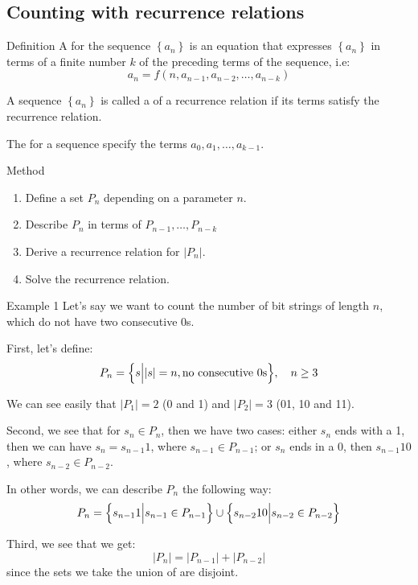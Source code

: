 \documentclass[a4paper]{article}
\begin{document}
\subsection{Counting with recurrence relations}
\begin{parag}{Definition}
    A  for the sequence $\left\{a_n\right\}$ is an equation that expresses $\left\{a_n\right\}$ in terms of a finite number $k$ of the preceding terms of the sequence, i.e: 
    \[a_n = f\left(n, a_{n-1}, a_{n-2}, \ldots, a_{n-k}\right)\]
    
    A sequence $\left\{a_n\right\}$ is called a  of a recurrence relation if its terms satisfy the recurrence relation.

    The  for a sequence specify the terms $a_0, a_1, \ldots, a_{k-1}$.
\end{parag}

\begin{parag}{Method}
    \begin{enumerate}[left=0pt]
        \item Define a set $P_n$ depending on a parameter $n$.
        \item Describe $P_n$ in terms of $P_{n-1}, \ldots, P_{n-k}$
        \item Derive a recurrence relation for $\left|P_n\right|$.
        \item Solve the recurrence relation.
    \end{enumerate}
\end{parag}

\begin{parag}{Example 1}
    Let's say we want to count the number of bit strings of length $n$, which do not have two consecutive 0s. 

    First, let's define:
    \[P_n = \left\{s \eval \left|s\right| = n, \text{no consecutive 0s}\right\}, \mathspace n \geq 3\]

    We can see easily that $\left|P_1\right| = 2$ (0 and 1) and $\left|P_2\right| = 3$ (01, 10 and 11). 

    Second, we see that for $s_n \in P_n$, then we have two cases: either $s_n$ ends with a 1, then we can have $s_n = s_{n-1} 1$, where $s_{n-1} \in P_{n-1}$; or $s_n$ ends in a 0, then $s_{n-1} 10$, where $s_{n-2} \in P_{n-2}$.

    In other words, we can describe $P_n$ the following way: 
    \[P_n = \left\{s_{n-1} 1 \eval s_{n-1} \in P_{n-1}\right\} \cup \left\{s_{n-2} 10 \eval s_{n-2} \in P_{n-2}\right\}\]

    Third, we see that we get: 
    \[\left|P_n\right| = \left|P_{n-1}\right| + \left|P_{n-2}\right|\]
    since the sets we take the union of are disjoint.
    
\end{parag}
\end{document}

